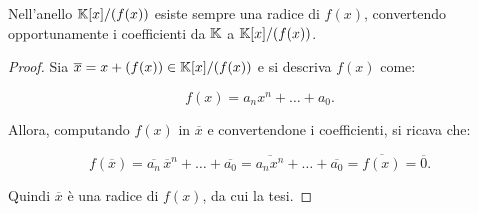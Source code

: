 \documentclass[11pt]{scrbook}
\begin{document}
\begin{proposition}
    \label{prop:radice_quoziente}
    Nell'anello $\mathbb{K}[x]/(f(x))$ esiste sempre una radice di $f(x)$,
    convertendo opportunamente i coefficienti da $\mathbb{K}$ a $\mathbb{K}[x]/(f(x))$.
\end{proposition}

\begin{proof}
    Sia $\overline{x} = x + (f(x)) \in \mathbb{K}[x]/(f(x))$ e si descriva $f(x)$ come:

    \[ f(x)=a_nx^n+\ldots+a_0. \]

    Allora, computando $f(x)$ in $\overline{x}$ e convertendone
    i coefficienti, si ricava che:

    \[f(\overline{x})=\overline{a_n} \, \overline{x}^n + \ldots + \overline{a_0} =
        \overline{a_n x^n} + \ldots + \overline{a_0} = \overline{f(x)} =
        \overline{0}.\]

    Quindi $\overline{x}$ è una radice di $f(x)$, da cui la tesi.

\end{proof}
\end{document}
